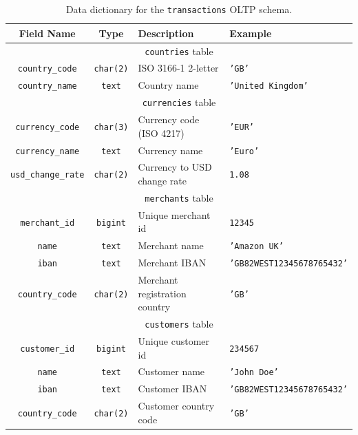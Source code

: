 \documentclass[11pt,a4paper,computermodern]{article}
\newcommand{\code}{\texttt}
\begin{document}
\begin{table}[!htb]
	\centering
	\begin{threeparttable}
		\caption{Data dictionary for the \code{transactions} OLTP schema.}
		\label{table:ReferenceDataDict}
		\begin{tabularx}{0.99\textwidth}{c c >{\centering\arraybackslash}X >{\centering\arraybackslash}X}
			\toprule
			Field Name & Type & Description & Example  \\
			\midrule
			\multicolumn{4}{c}{\code{countries} table}\\
			\code{country\_code} & \code{char(2)} & ISO 3166-1 2-letter & \code{'GB'} \\
			\code{country\_name} & \code{text} & Country name & \code{'United Kingdom'} \\
			
			\midrule
			\multicolumn{4}{c}{\code{currencies} table}\\
			\code{currency\_code} & \code{char(3)} & Currency code (ISO 4217) & \code{'EUR'} \\
			\code{currency\_name} & \code{text} & Currency name & \code{'Euro'} \\
			\code{usd\_change\_rate} & \code{char(2)} & Currency to USD change rate & \code{1.08} \\
			
			\midrule
			\multicolumn{4}{c}{\code{merchants} table}\\
			\code{merchant\_id} & \code{bigint} & Unique merchant id & \code{12345} \\
			\code{name} & \code{text} & Merchant name & \code{'Amazon UK'} \\
			\code{iban} & \code{text} & Merchant IBAN & \code{'GB82WEST12345678765432'} \\
			\code{country\_code} & \code{char(2)} & Merchant registration country & \code{'GB'} \\
			
			\midrule
			\multicolumn{4}{c}{\code{customers} table}\\
			\code{customer\_id} & \code{bigint} & Unique customer id & \code{234567} \\
			\code{name} & \code{text} & Customer name & \code{'John Doe'} \\
			\code{iban} & \code{text} & Customer IBAN & \code{'GB82WEST12345678765432'} \\
			\code{country\_code} & \code{char(2)} & Customer country code  & \code{'GB'} \\
			
			\bottomrule
		\end{tabularx}
	\end{threeparttable}
\end{table}
\end{document}
